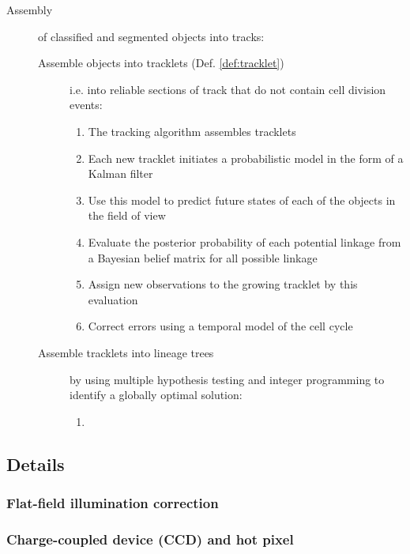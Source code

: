 \begin{description}
    \item[Assembly] of classified and segmented objects into tracks:
    \begin{description}
        \item[Assemble objects into tracklets (Def. \ref{def:tracklet}) ] i.e. into reliable sections of track that do not contain cell division events:
        \begin{enumerate}
            \item The tracking algorithm assembles tracklets
            \item Each new tracklet initiates a probabilistic model in the form of a Kalman filter \cite{kalman1960new}
            \item Use this model to predict future states of each of the objects in the field of view
            \item Evaluate the posterior probability of each potential linkage from a Bayesian belief matrix for all possible linkage
            \item Assign new observations to the growing tracklet by this evaluation
            \item Correct errors using a temporal model of the cell cycle \cite{held2010cellcognition}
        \end{enumerate}
        \item[Assemble tracklets into lineage trees ] by using multiple hypothesis testing and integer programming \cite{al2006automated,bise2011reliable} to identify a globally optimal solution:
        \begin{enumerate}
            \item 
        \end{enumerate}
    \end{description}
\end{description}

\subsection{Details}
\subsubsection{Flat-field illumination correction}
\subsubsection{Charge-coupled device (CCD) and hot pixel}
